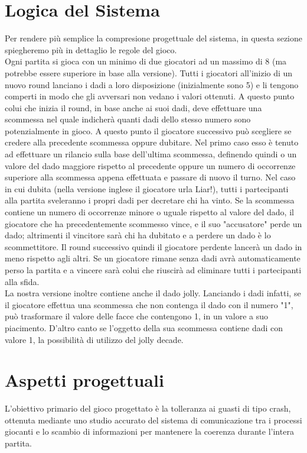 \documentclass{llncs}
\begin{document}
	\section{Logica del Sistema}
		Per rendere più semplice la compresione progettuale del sistema, in questa sezione spiegheremo più in dettaglio le regole del gioco. \\
		Ogni partita si gioca con un minimo di due giocatori ad un massimo di 8 (ma potrebbe essere superiore in base alla versione). Tutti i giocatori all'inizio di un nuovo round lanciano i dadi a loro disposizione (inizialmente sono 5) e li tengono comperti in modo che gli avversari non vedano i valori ottenuti. A questo punto colui che inizia il round, in base anche ai suoi dadi, deve effettuare una scommessa nel quale indicherà quanti dadi dello stesso numero sono potenzialmente in gioco. A questo punto il giocatore successivo può scegliere se credere alla precedente scommessa oppure dubitare. Nel primo caso esso è tenuto ad effettuare un rilancio sulla base dell'ultima scommessa, definendo quindi o un valore del dado maggiore rispetto al precedente oppure un numero di occorrenze superiore alla scommessa appena effettuata e passare di nuovo il turno. Nel caso in cui dubita (nella versione inglese il giocatore urla Liar!), tutti i partecipanti alla partita sveleranno i propri dadi per decretare chi ha vinto. Se la scommessa contiene un numero di occorrenze minore o uguale rispetto al valore del dado, il giocatore che ha precedentemente scommesso vince, e il suo "accusatore" perde un dado; altrimenti il vincitore sarà chi ha dubitato e a perdere un dado è lo scommettitore. Il round successivo quindi il giocatore perdente lancerà un dado in meno rispetto agli altri. Se un giocatore rimane senza dadi avrà automaticamente perso la partita e a vincere sarà colui che riuscirà ad eliminare tutti i partecipanti alla sfida.\\
		La nostra versione inoltre contiene anche il dado jolly. Lanciando i dadi infatti, se il giocatore effettua una scommessa che non contenga il dado con il numero "1", può trasformare il valore delle facce che contengono 1, in un valore a suo piacimento. D'altro canto se l'oggetto della sua scommessa contiene dadi con valore 1, la possibilità di utilizzo del jolly decade.
	
\section{Aspetti progettuali}
L'obiettivo primario del gioco progettato è la tolleranza ai guasti di tipo crash, ottenuta mediante uno studio accurato del sistema di comunicazione tra i processi giocanti e lo scambio di informazioni per mantenere la coerenza durante l'intera partita.\\
\end{document}
